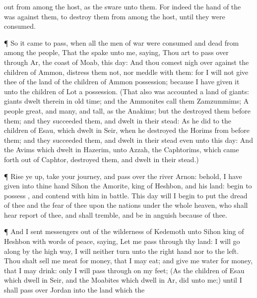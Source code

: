 {out from
among the
host, as the
{}
sware unto them.
For indeed the
hand of the
{} was against them, to
destroy them from
among the
host, until they were
consumed.
\par }{\PP {}¶ So it came to pass, when all the
men of
war were
consumed and
dead from
among the
people,
That the
{}
spake unto me,
saying,
Thou art to pass
over through
Ar, the
coast of
Moab, this
day:
And
{} thou comest
nigh over
against the
children of
Ammon,
distress them not, nor
meddle with them: for I will not
give thee of the
land of the
children of
Ammon
{}
possession; because I have
given it unto the
children of
Lot
{} a
possession.
(That also was
accounted a
land of
giants:
giants
dwelt therein in old
time; and the
Ammonites
call them
Zamzummims;
A
people
great, and
many, and
tall, as the
Anakims; but the
{}
destroyed them
before them; and they
succeeded them, and
dwelt in their stead:
As he
did to the
children of
Esau, which
dwelt in
Seir, when he
destroyed the
Horims from
before them; and they
succeeded them, and
dwelt in their stead even unto this
day:
And the
Avims which
dwelt in
Hazerim,
{} unto
Azzah, the
Caphtorims, which came
forth out of
Caphtor,
destroyed them, and
dwelt in their stead.)
\par }{\PP {}¶ Rise ye
up, take your
journey, and pass
over the
river
Arnon:
behold, I have
given into thine
hand
Sihon the
Amorite,
king of
Heshbon, and his
land:
begin to
possess
{}, and
contend with him in
battle.
This
day will I
begin to
put the
dread of thee and the
fear of thee upon the
nations
{} under the whole
heaven, who shall
hear
report of thee, and shall
tremble, and be in
anguish because of
thee.
\par }{\PP {}¶ And I
sent
messengers out of the
wilderness of
Kedemoth unto
Sihon
king of
Heshbon with
words of
peace,
saying,
Let me
pass through thy
land: I will
go along by the high
way, I will neither
turn unto the right
hand nor to the
left.
Thou shalt
sell me
meat for
money, that I may
eat; and
give me
water for
money, that I may
drink: only I will pass
through on my
feet;
(As the
children of
Esau which
dwell in
Seir, and the
Moabites which
dwell in
Ar,
did unto me;) until I shall pass
over
Jordan into the
land which the
{\ND{
}}}

